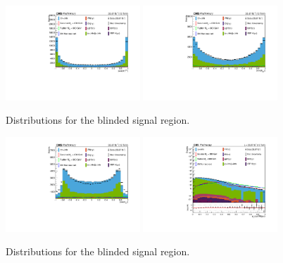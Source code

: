 \begin{figure}[thb]
  \centering
\includegraphics[width=0.45\textwidth]{figures/sec-control/NP_CosThetaStar_CS.pdf}\hfil
\includegraphics[width=0.45\textwidth]{figures/sec-control/NP_CosTheta_bb.pdf}\hfil
  \caption{Distributions for the blinded signal region.}
\label{fig:cp_mgg3}
\end{figure}
\begin{figure}[thb]
  \centering
\includegraphics[width=0.45\textwidth]{figures/sec-control/NP_CosTheta_gg.pdf}\hfil
\includegraphics[width=0.45\textwidth]{figures/sec-control/LOG_ggptmjjgg.pdf}\hfil
  \caption{Distributions for the blinded signal region.}
\label{fig:cp_mgg4}
\end{figure}
